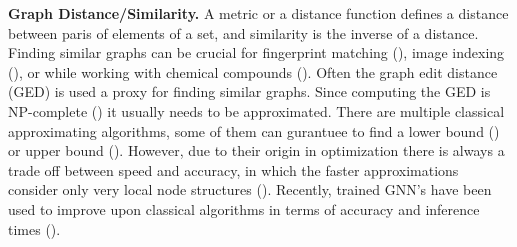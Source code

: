 \textbf{Graph Distance/Similarity.} A metric or a distance function defines a distance between paris of elements of a set, and similarity is the inverse of a distance. Finding similar graphs can be crucial for fingerprint matching (\citealp{fingerprint2005}), image indexing (\citealp{image_index2008}), or while working with chemical compounds (\citealp{chem2006}). Often the graph edit distance (GED) is used a proxy for finding similar graphs. Since computing the GED is NP-complete (\citealp{np_complete1998}) it usually needs to be approximated. There are multiple classical approximating algorithms, some of them can gurantuee to find a lower bound (\citealp{hungarian2009}) or upper bound (\citealp{hed2015}). However, due to their origin in optimization there is always a trade off between speed and accuracy, in which the faster approximations consider only very local node structures (\citealp{hungarian2009}). Recently, trained GNN's have been used to improve upon classical algorithms in terms of accuracy and inference times (\citealp{bai2019}). %
